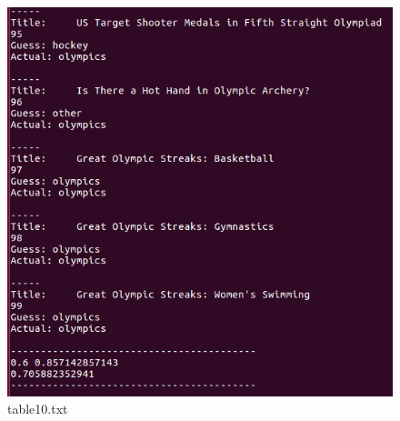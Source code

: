 \documentclass{article}
\begin{document}
\begin{figure} [H]
 \centering
 \includegraphics[height = 10 cm]{res2.png}
 \caption{table10.txt}
\end{figure}






\end{document}
